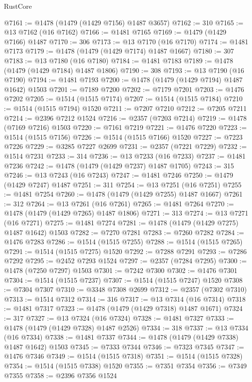 \begin{lexlean}{RustCore}
\begin{coremodule}
@7161 := @1478 (@1479 (@1429 @7156) @1487 @3657)
@7162 := 310
@7165 := @13 @7162 (@16 @7162)
@7166 := @1481 @7165
@7169 := @1479 (@1429 @7166) @1487
@7170 := 306
@7173 := @13 @7170 (@16 @7170)
@7174 := @1481 @7173
@7179 := @1478 (@1479 (@1429 @7174) @1487 @1667)
@7180 := 307
@7183 := @13 @7180 (@16 @7180)
@7184 := @1481 @7183
@7189 := @1478 (@1479 (@1429 @7184) @1487 @1806)
@7190 := 308
@7193 := @13 @7190 (@16 @7190)
@7194 := @1481 @7193
@7200 := @1478 (@1479 (@1429 @7194) @1487 @1642) @1503
@7201 := @7189 @7200
@7202 := @7179 @7201
@7203 := @1476 @7202
@7205 := @1514 (@1515 @7174)
@7207 := @1514 (@1515 @7184)
@7210 := @1514 (@1515 @7194) @1520
@7211 := @7207 @7210
@7212 := @7205 @7211
@7214 := @2396 @7212 @1524
@7216 := @2357 (@7203 @7214)
@7219 := @1478 (@7169 @7216) @1503
@7220 := @7161 @7219
@7221 := @1476 @7220
@7223 := @1514 (@1515 @7156)
@7226 := @1514 (@1515 @7166) @1520
@7227 := @7223 @7226
@7229 := @3285 @7227 @2699
@7231 := @2357 (@7221 @7229)
@7232 := @1514 @7231
@7233 := 314
@7236 := @13 @7233 (@16 @7233)
@7237 := @1481 @7236
@7242 := @1478 (@1479 (@1429 @7237) @1487 @1705)
@7243 := 315
@7246 := @13 @7243 (@16 @7243)
@7247 := @1481 @7246
@7250 := @1479 (@1429 @7247) @1487
@7251 := 311
@7254 := @13 @7251 (@16 @7251)
@7255 := @1481 @7254
@7260 := @1478 (@1479 (@1429 @7255) @1487 @1667)
@7261 := 312
@7264 := @13 @7261 (@16 @7261)
@7265 := @1481 @7264
@7270 := @1478 (@1479 (@1429 @7265) @1487 @1806)
@7271 := 313
@7274 := @13 @7271 (@16 @7271)
@7275 := @1481 @7274
@7281 := @1478 (@1479 (@1429 @7275) @1487 @1642) @1503
@7282 := @7270 @7281
@7283 := @7260 @7282
@7284 := @1476 @7283
@7286 := @1514 (@1515 @7255)
@7288 := @1514 (@1515 @7265)
@7291 := @1514 (@1515 @7275) @1520
@7292 := @7288 @7291
@7293 := @7286 @7292
@7295 := @2452 @7293 @1524
@7297 := @2357 (@7284 @7295)
@7300 := @1478 (@7250 @7297) @1503
@7301 := @7242 @7300
@7302 := @1476 @7301
@7304 := @1514 (@1515 @7237)
@7307 := @1514 (@1515 @7247) @1520
@7308 := @7304 @7307
@7310 := @3348 @7308 @2699
@7312 := @2357 (@7302 @7310)
@7313 := @1514 @7312
@7314 := 316
@7317 := @13 @7314 (@16 @7314)
@7318 := @1481 @7317
@7323 := @1478 (@1479 (@1429 @7318) @1487 @1671)
@7324 := 317
@7327 := @13 @7324 (@16 @7324)
@7328 := @1481 @7327
@7333 := @1478 (@1479 (@1429 @7328) @1487 @2526)
@7334 := 318
@7337 := @13 @7334 (@16 @7334)
@7338 := @1481 @7337
@7344 := @1478 (@1479 (@1429 @7338) @1487 @1642) @1503
@7345 := @7333 @7344
@7346 := @7323 @7345
@7347 := @1476 @7346
@7349 := @1514 (@1515 @7318)
@7351 := @1514 (@1515 @7328)
@7354 := @1514 (@1515 @7338) @1520
@7355 := @7351 @7354
@7356 := @7349 @7355
@7358 := @2396 @7356 @1524

\end{coremodule}
\end{lexlean}
